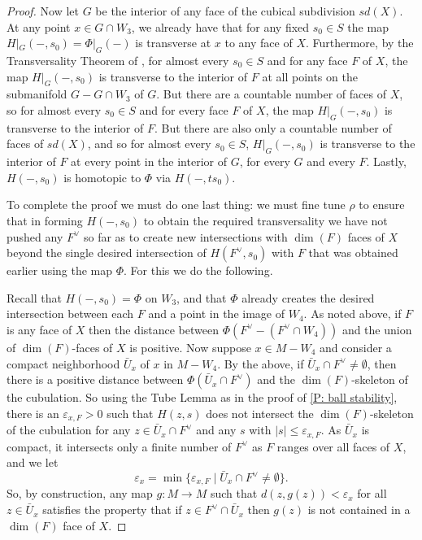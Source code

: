 \begin{proof}
	Now let $G$ be the interior of any face of the cubical subdivision $sd(X)$.
	At any point $x \in G \cap W_3$, we already have that for any fixed $s_0 \in S$ the map $H|_G(-,s_0) = \Phi|_G(-)$ is transverse at $x$ to any face of $X$.
	Furthermore, by the Transversality Theorem of \cite{GuPo74}, for almost every $s_0 \in S$ and for any face $F$ of $X$, the map $H|_G(-,s_0)$ is transverse to the interior of $F$ at all points on the submanifold $G-G \cap W_3$ of $G$.
	But there are a countable number of faces of $X$, so for almost every $s_0 \in S$ and for every face $F$ of $X$, the map $H|_G(-,s_0)$ is transverse to the interior of $F$.
	But there are also only a countable number of faces of $sd(X)$, and so for almost every $s_0 \in S$, $H|_G(-,s_0)$ is transverse to the interior of $F$ at every point in the interior of $G$, for every $G$ and every $F$.
	Lastly, $H(-,s_0)$ is homotopic to $\Phi$ via $H(-, ts_0)$.

	To complete the proof we must do one last thing: we must fine tune $\rho$ to ensure that in forming $H(-,s_0)$ to obtain the required transversality we have not pushed any $F^\vee$ so far as to create new intersections with $\dim(F)$ faces of $X$ beyond the single desired intersection of $H(F^\vee,s_0)$ with $F$ that was obtained earlier using the map $\Phi$.
	For this we do the following.

	Recall that $H(-,s_0) = \Phi$ on $W_3$, and that $\Phi$ already creates the desired intersection between each $F$ and a point in the image of $W_4$.
	As noted above, if $F$ is any face of $X$ then the distance between $\Phi(F^\vee-(F^\vee \cap W_4))$ and the union of $\dim(F)$-faces of $X$ is positive.
	Now suppose $x \in M-W_4$ and consider a compact neighborhood $\bar U_x$ of $x$ in $M-W_4$.
	By the above, if $\bar U_x \cap F^\vee \neq \emptyset$, then there is a positive distance between $\Phi(\bar U_x \cap F^\vee)$ and the $\dim(F)$-skeleton of the cubulation.
	So using the Tube Lemma as in the proof of \cref{P: ball stability}, there is an $\varepsilon_{x,F} > 0$ such that $H(z,s)$ does not intersect the $\dim(F)$-skeleton of the cubulation for any $z \in \bar U_x \cap F^\vee$ and any $s$ with $|s| \leq \varepsilon_{x,F}$.
	As $\bar U_x$ is compact, it intersects only a finite number of $F^\vee$ as $F$ ranges over all faces of $X$, and we let $$\varepsilon_x = \min\{\varepsilon_{x,F} \mid \bar U_x \cap F^\vee\neq \emptyset\}.$$
	So, by construction, any map $g \colon M \to M$ such that $d(z,g(z))<\varepsilon_x$ for all $z \in \bar U_x$ satisfies the property that if $z \in F^\vee \cap \bar U_x$ then $g(z)$ is not contained in a $\dim(F)$ face of $X$.


\end{proof}
